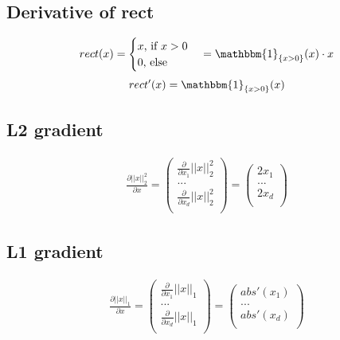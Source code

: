 \documentclass[12pt]{article}
\begin{document}
\subsection{Derivative of rect}
\begin{align*}
rect(x)=\begin{cases}
               x$, if $ x > 0 \\
               0 $, else$ \\
            \end{cases} = \mathbbm{1}_{\{x>0\}}(x) \cdot x
\end{align*}
\begin{align*}
rect'(x) = \mathbbm{1}_{\{x>0\}}(x)
\end{align*}
\subsection{L2 gradient}
\begin{align*}
\frac{\partial || x ||^2_2}{\partial x} = \begin{pmatrix}
\frac{\partial}{\partial x_1} || x ||^2_2 \\
... \\
\frac{\partial}{\partial x_d} || x ||^2_2 \\
\end{pmatrix} = 
\begin{pmatrix}
2x_1 \\
... \\
2x_d \\
\end{pmatrix}
\end{align*}
\subsection{L1 gradient}
\begin{align*}
\frac{\partial || x ||_1}{\partial x} = \begin{pmatrix}
\frac{\partial}{\partial x_1} || x ||_1 \\
... \\
\frac{\partial}{\partial x_d} || x ||_1 \\
\end{pmatrix} = 
\begin{pmatrix}
abs'(x_1) \\
... \\
abs'(x_d) \\
\end{pmatrix}
\end{align*}
\end{document}
